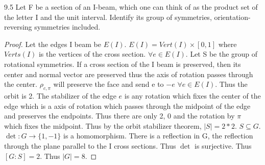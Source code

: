 \documentclass{article}
\begin{document}
\bigskip

\begin{PROB}{9.5}\label{Problem 9.5.}
    Let F be a section of an I-beam, which one can think of as the product set of the letter I and the unit interval. Identify its group of symmetries, orientation-reversing symmetries included.
\end{PROB}
\begin{proof}
    Let the edges I beam be $E(I)$. $E(I) = Vert(I) \times [0, 1]$ where $ Verts(I)$ is the vertices of the cross section. $\forall e \in E(I)$. Let S be the group of rotational symmetries. If a cross section of the I beam is preserved, then its center and normal vector are preserved thus the axis of rotation passes through the center. $\rho_{c, \pi}$ will preserve the face and send e to $-e$ $\forall e \in E(I)$. Thus the orbit is 2. The stabilizer of the edge $e$ is any rotation which fixes the center of the edge which is a axis of rotation which passes through the midpoint of the edge and preserves the endpoints. Thus there are only 2, 0 and the rotation by $\pi$ which fixes the midpoint. Thus by the orbit stabilizer theorem, $|S| = 2 * 2$. $S \subseteq G$. $\det: G \to \{1, -1\}$ is a homomorphism. There is a reflection in G, the reflection through the plane parallel to the I cross sections. Thus $\det$ is surjective. Thus $[G : S] = 2$. Thus $|G| = 8$.
\end{proof}

\bigskip
\end{document}
